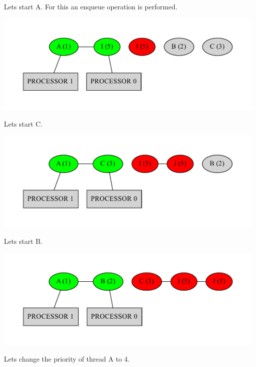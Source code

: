Lets start A. For this an enqueue operation is performed.


\begin{DoxyImageNoCaption}
  \mbox{\includegraphics[width=\textwidth,height=\textheight/2,keepaspectratio=true]{dot_inline_dotgraph_6}}
\end{DoxyImageNoCaption}


Lets start C.


\begin{DoxyImageNoCaption}
  \mbox{\includegraphics[width=\textwidth,height=\textheight/2,keepaspectratio=true]{dot_inline_dotgraph_7}}
\end{DoxyImageNoCaption}


Lets start B.


\begin{DoxyImageNoCaption}
  \mbox{\includegraphics[width=\textwidth,height=\textheight/2,keepaspectratio=true]{dot_inline_dotgraph_8}}
\end{DoxyImageNoCaption}


Lets change the priority of thread A to 4.


